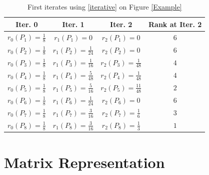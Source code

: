 \documentclass[11pt]{report}
\begin{document}
 \begin{table}[H] \caption{First iterates using \eqref{iterative} on Figure \ref{Example}}
 \centering
 \begin{tabular} {c c c |c} 
 Iter. 0 & Iter. 1 & Iter. 2 &  Rank at Iter. 2 \\ [0.5ex] 
 \hline
 $r_0(P_1)=\frac{1}{8}$ & $r_1(P_1)=0$ & $r_2(P_1)=0$ & $6$ \\ 
 $r_0(P_2)=\frac{1}{8}$ & $r_1(P_2)=\frac{1}{24}$ & $r_2(P_2)=0$ & $6$ \\ 
 $r_0(P_3)=\frac{1}{8}$ & $r_1(P_3)=\frac{1}{16}$ & $r_2(P_3)=\frac{1}{48}$ & $4$ \\ 
 $r_0(P_4)=\frac{1}{8}$ & $r_1(P_4)=\frac{5}{48}$ & $r_2(P_4)=\frac{1}{48}$ & $4$ \\ 
 $r_0(P_5)=\frac{1}{8}$ & $r_1(P_5)=\frac{5}{16}$ & $r_2(P_5)=\frac{11}{48}$ & $2$ \\ 
 $r_0(P_6)=\frac{1}{8}$ & $r_1(P_6)=\frac{1}{24}$ & $r_2(P_6)=0$ & $6$ \\ 
 $r_0(P_7)=\frac{1}{8}$ & $r_1(P_7)=\frac{3}{16}$ & $r_2(P_7)=\frac{1}{6}$ & $3$ \\ 
 $r_0(P_8)=\frac{1}{8}$ & $r_1(P_8)=\frac{3}{16}$ & $r_2(P_8)=\frac{1}{3}$ & $1$ \\ \end{tabular}
\label{table1}
\end{table}

\section{Matrix Representation}
\end{document}
